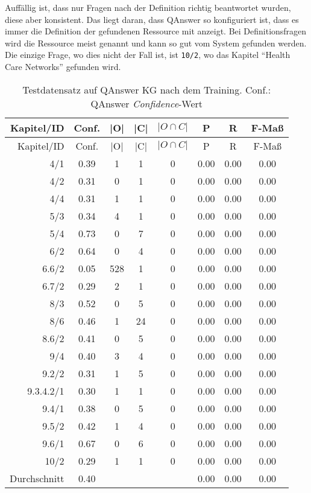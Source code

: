 Auffällig ist, dass nur Fragen nach der Definition richtig beantwortet wurden, diese aber konsistent.
Das liegt daran, dass QAnswer so konfiguriert ist, dass es immer die Definition der gefundenen Ressource mit anzeigt.
Bei Definitionsfragen wird die Ressource meist genannt und kann so gut vom System gefunden werden.
Die einzige Frage, wo dies nicht der Fall ist, ist \texttt{10/2}, wo das Kapitel \enquote{Health Care Networks} gefunden wird.

\begin{longtable}{r c c c c c c c}
  \caption[Testdatensatz QAnswer nach Training]{Testdatensatz auf QAnswer KG nach dem Training.
  Conf.: QAnswer \emph{Confidence}-Wert}
  \label{tab:qanswernachtraining}
  \\
  \toprule
  Kapitel/ID    & Conf. & |O|   & |C|   & $|O \cap C|$  & P     & R     & F-Maß   \\
  \midrule
  \endfirsthead
  \toprule
  Kapitel/ID    & Conf. & |O|   & |C|   & $|O \cap C|$  & P     & R     & F-Maß   \\
  \midrule
  \endhead
	4/1			& 0.39 & 1 & 1 & 0 & 0.00 & 0.00 & 0.00 \\
	4/2			& 0.31 & 0 & 1 & 0 & 0.00 & 0.00 & 0.00 \\
	4/4			& 0.31 & 1 & 1 & 0 & 0.00 & 0.00 & 0.00 \\
	5/3			& 0.34 & 4 & 1 & 0 & 0.00 & 0.00 & 0.00 \\
	5/4			& 0.73 & 0 & 7 & 0 & 0.00 & 0.00 & 0.00 \\
	6/2			& 0.64 & 0 & 4 & 0 & 0.00 & 0.00 & 0.00 \\
	6.6/2		& 0.05 & 528 & 1 & 0 & 0.00 & 0.00 & 0.00 \\
	6.7/2		& 0.29 & 2 & 1 & 0 & 0.00 & 0.00 & 0.00 \\
	8/3			& 0.52 & 0 & 5 & 0 & 0.00 & 0.00 & 0.00 \\
	8/6			& 0.46 & 1 & 24 & 0 & 0.00 & 0.00 & 0.00 \\
	8.6/2		& 0.41 & 0 & 5 & 0 & 0.00 & 0.00 & 0.00 \\
	9/4			& 0.40 & 3 & 4 & 0 & 0.00 & 0.00 & 0.00 \\
	9.2/2		& 0.31 & 1 & 5 & 0 & 0.00 & 0.00 & 0.00 \\
	9.3.4.2/1	& 0.30 & 1 & 1 & 0 & 0.00 & 0.00 & 0.00 \\
	9.4/1		& 0.38 & 0 & 5 & 0 & 0.00 & 0.00 & 0.00 \\
	9.5/2		& 0.42 & 1 & 4 & 0 & 0.00 & 0.00 & 0.00 \\
	9.6/1		& 0.67 & 0 & 6 & 0 & 0.00 & 0.00 & 0.00 \\
	10/2		& 0.29 & 1 & 1 & 0 & 0.00 & 0.00 & 0.00 \\
  \midrule
  Durchschnitt  & 0.40 &  &  &   & 0.00 & 0.00 & 0.00 \\
  \bottomrule
\end{longtable}

